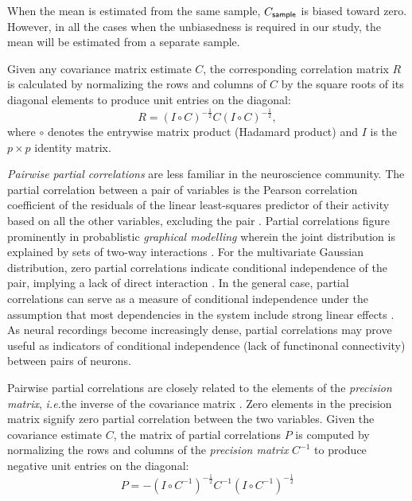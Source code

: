 \documentclass[10pt]{article}
\newcommand{\ie}{\emph{i.e.}\;}
\begin{document}
When the mean is estimated from the same sample, $C_{\sf sample}$ is biased toward zero.  However, in all the cases when the unbiasedness is required in our study, the mean will be estimated from a separate sample.

Given any covariance matrix estimate $C$, the corresponding correlation matrix $R$ is calculated by normalizing the rows and columns of $C$ by the square roots of its diagonal elements to produce unit entries on the diagonal:
\begin{equation}\label{eq:precision}
    R = \left(I\circ C\right)^{-\frac 1 2} C \left(I\circ C\right)^{-\frac 1 2},
\end{equation}
where $\circ$ denotes the entrywise matrix product (Hadamard product) and $I$ is the $p\times p$ identity matrix. 

\emph{Pairwise partial correlations} are less familiar in the neuroscience community. 
The partial correlation between a pair of variables is the Pearson correlation coefficient of the residuals of the linear least-squares predictor of their activity based on all the other variables, excluding the pair \cite{Anderson:2003, Whittaker:1990}. Partial correlations figure prominently in probablistic \emph{graphical modelling} wherein the joint distribution is explained by sets of two-way interactions \cite{Whittaker:1990}. For the multivariate Gaussian distribution, zero partial correlations indicate conditional independence of the pair, implying a lack of direct interaction \cite{Dempster:1972, Whittaker:1990}. In the general case, partial correlations can serve as a measure of conditional independence under the assumption that most dependencies in the system include strong linear effects \cite{Whittaker:1990,Baba:2004}. As neural recordings become increasingly dense, partial correlations may prove useful as indicators of conditional independence (lack of functinonal connectivity) between pairs of neurons.

Pairwise partial correlations are closely related to the elements of the \emph{precision matrix}, \ie the inverse of the covariance matrix \cite{Dempster:1972,Whittaker:1990}. Zero elements in the precision matrix signify zero partial correlation between the two variables. Given the covariance estimate $C$, the matrix of partial correlations $P$ is computed by normalizing the rows and columns of the \emph{precision matrix} $C^{-1}$ to produce negative unit entries on the diagonal:
\begin{equation}\label{eq:partial}
    P = -\left(I\circ C^{-1}\right)^{-\frac 1 2} C^{-1} \left(I\circ C^{-1}\right)^{-\frac 1 2}
\end{equation}
\end{document}
